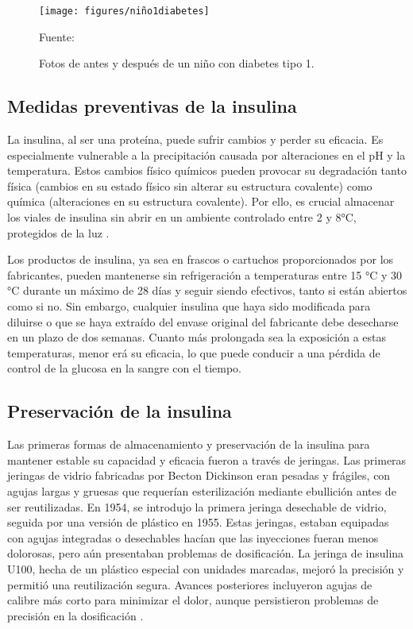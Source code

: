 \begin{figure}[H]
	\centering
	\texttt{[image: figures/niño1diabetes]}
	\caption{Fotos de antes y después de un niño con diabetes tipo 1.}
	Fuente: \cite{novo}
	\label{fig:nino1diabetes}
\end{figure}

\subsection{Medidas preventivas de la insulina}
La insulina, al ser una proteína, puede sufrir cambios y perder su eficacia. Es especialmente vulnerable a la precipitación causada por alteraciones en el pH y la temperatura. Estos cambios físico químicos pueden provocar su degradación tanto física (cambios en su estado físico sin alterar su estructura covalente) como química (alteraciones en su estructura covalente). Por ello, es crucial almacenar los viales de insulina sin abrir en un ambiente controlado entre 2 y 8°C, protegidos de la luz \cite{khurana2019}.

Los productos de insulina, ya sea en frascos o cartuchos proporcionados por los fabricantes, pueden mantenerse sin refrigeración a temperaturas entre 15 °C y 30 °C durante un máximo de 28 días y seguir siendo efectivos, tanto si están abiertos como si no. Sin embargo, cualquier insulina que haya sido modificada para diluirse o que se haya extraído del envase original del fabricante debe desecharse en un plazo de dos semanas. Cuanto más prolongada sea la exposición a estas temperaturas, menor erá su eficacia, lo que puede conducir a una pérdida de control de la glucosa en la sangre con el tiempo. 

\subsection{Preservación de la insulina}

Las primeras formas de almacenamiento y preservación de la insulina para mantener estable su capacidad y eficacia fueron a través de jeringas. Las primeras jeringas de vidrio fabricadas por Becton Dickinson eran pesadas y frágiles, con agujas largas y gruesas que requerían esterilización mediante ebullición antes de ser reutilizadas. En 1954, se introdujo la primera jeringa desechable de vidrio, seguida por una versión de plástico en 1955. Estas jeringas, estaban equipadas con agujas integradas o desechables hacían que las inyecciones fueran menos dolorosas, pero aún presentaban problemas de dosificación. La jeringa de insulina U100, hecha de un plástico especial con unidades marcadas, mejoró la precisión y permitió una reutilización segura. Avances posteriores incluyeron agujas de calibre más corto para minimizar el dolor, aunque persistieron problemas de precisión en la dosificación \cite{buse2021}.

